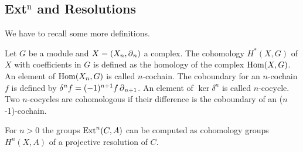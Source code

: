 \subsection{Ext$^\text{n}$ and Resolutions}
\label{ss:extnandresolutions}
We have to recall some more definitions.
\begin{definition}
Let $G$ be a module and $X=(X_n,\operatorname{\partial}_{n})$ a complex.
The cohomology $H^*(X,G)$ of $X$ with coefficients in $G$ is defined as the homology of the complex $\operatorname{Hom}(X,G)$.
An element of $\operatorname{Hom}(X_n,G)$ is called $n$-cochain.
The coboundary for an $n$-cochain $f$ is defined by $\delta^n f = (-1)^{n+1}f\operatorname{\partial}_{n+1}$.
An element of $\ker \delta^n$ is called $n$-cocycle.
Two $n$-cocycles are cohomologous if their difference is the coboundary of an ($n$-1)-cochain.
\end{definition}

For $n>0$ the groups $\operatorname{Ext}^{n}(C,A)$ can be computed as cohomology groups $H^{n}(X,A)$ of a projective resolution of $C$.

